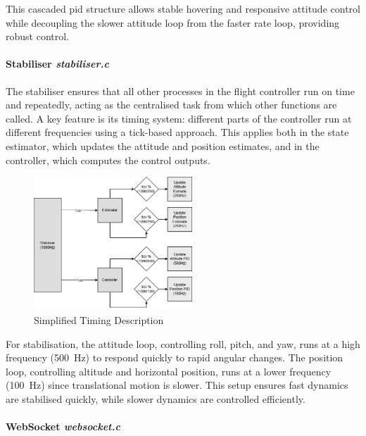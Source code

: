 This cascaded \gls{pid} structure allows stable hovering and responsive attitude control while decoupling the slower attitude loop from the faster rate loop, providing robust control.

\pagebreak
\paragraph{\textbf{Stabiliser} \textit{stabiliser.c}} \leavevmode

The stabiliser ensures that all other processes in the flight controller run on time and repeatedly, acting as the centralised task from which other functions are called. A key feature is its timing system: different parts of the controller run at different frequencies using a tick-based approach. This applies both in the state estimator, which updates the attitude and position estimates, and in the controller, which computes the control outputs.  

\begin{figure}[H]
    \centering
    \captionsetup{justification=centering, margin=1cm}
    \includegraphics[width=0.53\textwidth]{img/timing.PNG}
    \caption{Simplified Timing Description}
\end{figure}

For stabilisation, the attitude loop, controlling roll, pitch, and yaw, runs at a high frequency (500~Hz) to respond quickly to rapid angular changes. The position loop, controlling altitude and horizontal position, runs at a lower frequency (100~Hz) since translational motion is slower. This setup ensures fast dynamics are stabilised quickly, while slower dynamics are controlled efficiently.

\paragraph{\textbf{WebSocket} \textit{websocket.c}} \leavevmode

